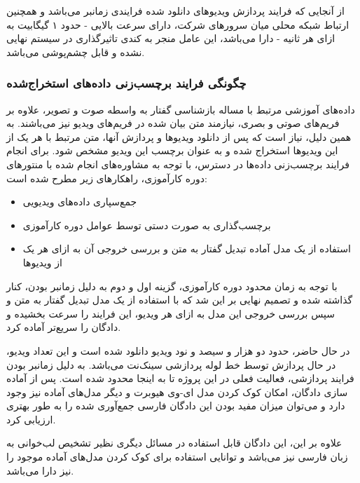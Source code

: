 از آنجایی که فرایند پردازش ویدیو‌های دانلود شده فرایندی زمانبر می‌باشد و همچنین ارتباط شبکه محلی میان سرور‌های شرکت، دارای سرعت بالایی - حدود ۱ گیگابیت به ازای هر ثانیه - دارا می‌باشد، این عامل منجر به کندی تاثیر‌گذاری در سیستم نهایی نشده و قابل چشم‌پوشی می‌باشد.

\subsubsection{چگونگی فرایند برچسب‌زنی داده‌های استخراج‌شده}

داده‌های آموزشی مرتبط با مساله بازشناسی گفتار به واسطه صوت و تصویر، علاوه بر فریم‌های صوتی و بصری، نیازمند متن بیان شده در فریم‌های ویدیو نیز می‌باشند. به همین دلیل، نیاز است که پس از دانلود ویدیو‌ها و پردازش آنها، متن مرتبط با هر یک از این ویدیو‌ها استخراج شده و به عنوان برچسب این ویدیو مشخص شود. برای انجام فرایند برچسب‌زنی داده‌ها در دسترس، با توجه به مشاوره‌های انجام شده با منتور‌های دوره کارآموزی، راهکارهای زیر مطرح شده است:

\begin{itemize}
	\item جمع‌سپاری
	داده‌های ویدیویی
	\item برچسب‌گذاری به صورت دستی توسط عوامل دوره کارآموزی
	\item استفاده از یک مدل آماده تبدیل گفتار به متن
	و بررسی خروجی آن به ازای هر یک از ویدیو‌ها
\end{itemize}

با توجه به زمان محدود دوره کارآموزی، گزینه اول و دوم به دلیل زمانبر بودن، کنار گذاشته شده و تصمیم نهایی بر این شد که با استفاده از یک مدل تبدیل گفتار به متن و سپس بررسی خروجی این مدل به ازای هر ویدیو، این فرایند را سرعت بخشیده و دادگان را سریع‌تر آماده کرد.

در حال حاضر، حدود دو هزار و سیصد و نود ویدیو دانلود شده است و این تعداد ویدیو، در حال پردازش توسط خط لوله پردازشی سینک‌نت می‌باشد. به دلیل زمانبر بودن فرایند پردازشی، فعالیت فعلی در این پروژه تا به اینجا محدود شده است. پس از آماده سازی دادگان، امکان کوک کردن مدل ای-وی هیوبرت و دیگر مدل‌های آماده نیز وجود دارد و می‌توان میزان مفید بودن این دادگان فارسی جمع‌آوری شده را به طور بهتری ارزیابی کرد.

علاوه بر این، این دادگان قابل استفاده در مسائل دیگری نظیر تشخیص لب‌خوانی به زبان فارسی نیز می‌باشد و توانایی استفاده برای کوک کردن مدل‌های آماده موجود را نیز دارا می‌باشد.